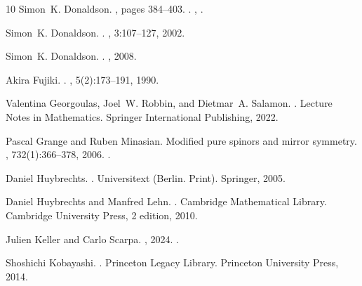 \documentclass{article}
\theoremstyle{remark}
\theoremstyle{definition}
\begin{document}
\begin{thebibliography}{10}
Simon~K. Donaldson.
, pages 384--403.
.
\newblock \href {https://arxiv.org/abs/https://worldscientific.com/doi/pdf/10.1142/9789812385215_0042} {}, \href {https://doi.org/10.1142/9789812385215_0042} {}.

Simon~K. Donaldson.
.
, 3:107--127, 2002.

Simon~K. Donaldson.
.
, 2008.

Akira Fujiki.
.
, 5(2):173--191, 1990.

Valentina Georgoulas, Joel~W. Robbin, and Dietmar~A. Salamon.
.
\newblock Lecture Notes in Mathematics. Springer International Publishing, 2022.

Pascal Grange and Ruben Minasian.
\newblock Modified pure spinors and mirror symmetry.
, 732(1):366--378, 2006.
\newblock \href {https://doi.org/10.1016/j.nuclphysb.2005.10.029} {}.

Daniel Huybrechts.
.
\newblock Universitext (Berlin. Print). Springer, 2005.

Daniel Huybrechts and Manfred Lehn.
.
\newblock Cambridge Mathematical Library. Cambridge University Press, 2 edition, 2010.

Julien Keller and Carlo Scarpa.
, 2024.
\newblock \href {https://arxiv.org/abs/2405.03312} {}.

Shoshichi Kobayashi.
.
\newblock Princeton Legacy Library. Princeton University Press, 2014.


\end{thebibliography}
\end{document}
